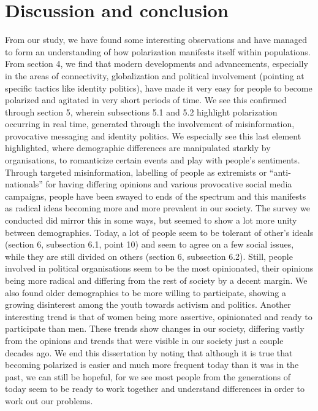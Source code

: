 \documentclass{article}
\begin{document}
\section{Discussion and conclusion}
From our study, we have found some interesting observations and have managed to form an understanding of how polarization manifests itself within populations.
\newline
From section 4, we find that modern developments and advancements, especially in the areas of connectivity, globalization and political involvement (pointing at specific tactics like identity politics), have made it very easy for people to become polarized and agitated in very short periods of time. 
\newline
We see this confirmed through section 5, wherein subsections 5.1 and 5.2 highlight polarization occurring in real time, generated through the involvement of misinformation, provocative messaging and identity politics. We especially see this last element highlighted, where demographic differences are manipulated starkly by organisations, to romanticize certain events and play with people’s sentiments. Through targeted misinformation, labelling of people as extremists or “anti-nationals” for having differing opinions and various provocative social media campaigns, people have been swayed to ends of the spectrum and this manifests as radical ideas becoming more and more prevalent in our society.
\newline
The survey we conducted did mirror this in some ways, but seemed to show a lot more unity between demographics. Today, a lot of people seem to be tolerant of other’s ideals (section 6, subsection 6.1, point 10) and seem to agree on a few social issues, while they are still divided on others (section 6, subsection 6.2).
\newline
Still, people involved in political organisations seem to be the most opinionated, their opinions being more radical and differing from the rest of society by a decent margin. We also found older demographics to be more willing to participate, showing a growing disinterest among the youth towards activism and politics. Another interesting trend is that of women being more assertive, opinionated and ready to participate than men. 
These trends show changes in our society, differing vastly from the opinions and trends that were visible in our society just a couple decades ago. 
\newline
We end this dissertation by noting that although it is true that becoming polarized is easier and much more frequent today than it was in the past, we can still be hopeful, for we see most people from the generations of today seem to be ready to work together and understand differences in order to work out our problems.
\newpage

\end{document}
